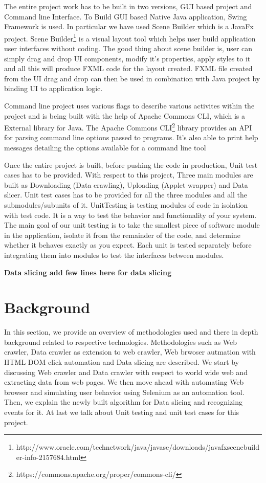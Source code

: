 \documentclass[article,type=msc,colorback,accentcolor=tud9c,twoside,11pt]{tudthesis}
\begin{document}
The entire project work has to be built in two versions, GUI based project and Command line Interface. To Build GUI based Native Java application, Swing Framework is used. In particular we have used Scene Builder which is a JavaFx\cite{JavaFx} project. Scene Builder\footnote{http://www.oracle.com/technetwork/java/javase/downloads/javafxscenebuilder-info-2157684.html} is a visual layout tool which helps user build application user interfaces without coding. The good thing about scene builder is, user can simply drag and drop UI components, modify it's properties, apply styles to it and all this will produce FXML code for the layout created. FXML file created from the UI drag and drop can then be used in combination with Java project by binding UI to application logic. 

Command line project uses various flags to describe various activites within the project and is being built with the help of Apache Commons CLI, which is a External library for Java. The Apache Commons CLI\footnote{https://commons.apache.org/proper/commons-cli/} library provides an API for parsing command line options passed to programs. It's also able to print help messages detailing the options available for a command line tool

Once the entire project is built, before pushing the code in production, Unit test cases has to be provided. With respect to this project, Three main modules are built as Downloading (Data crawling), Uploading (Applet wrapper) and Data slicer. Unit test cases has to be provided for all the three modules and all the submodules/subunits of it. UnitTesting\cite{EffectivnessofUnitTest} is testing modules of code in isolation with test code. It is a way to test the behavior and functionality of your system. The main goal of our unit testing is to take the smallest piece of software module in the application, isolate it from the remainder of the code, and determine whether it behaves exactly as you expect. Each unit is tested separately before integrating them into modules to test the interfaces between modules.


\textbf{Data slicing add few lines here for data slicing}

\clearpage
\section{Background}
In this section, we provide an overview of methodologies used and there in depth background related to respective technologies. Methodologies such as Web crawler, Data crawler as extension to web crawler, Web brwoser autmation with HTML DOM click automation and Data slicing are described. We start by discussing Web crawler and Data crawler with respect to world wide web and extracting data from web pages. We then move ahead with automating Web browser and simulating user behavior using Selenium as an automation tool. Then, we explain the newly built algorithm for Data slicing and recognizing events for it. At last we talk about Unit testing and unit test cases for this project.
\end{document}
